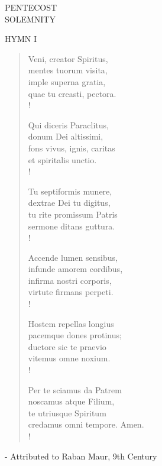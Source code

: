 \begin{center}\normalsize PENTECOST\\
\footnotesize SOLEMNITY\\
\end{center}

\noindent\small{\uppercase{Hymn I}}\normalsize
\begin{verse}
Veni, creator Spiritus,\\
mentes tuorum visita,\\
imple superna gratia,\\
quae tu creasti, pectora.\\!

Qui diceris Paraclitus,\\
donum Dei altissimi,\\
fons vivus, ignis, caritas\\
et spiritalis unctio.\\!

Tu septiformis munere,\\
dextrae Dei tu digitus,\\
tu rite promissum Patris\\
sermone ditans guttura.\\!

Accende lumen sensibus,\\
infunde amorem cordibus,\\
infirma nostri corporis,\\
virtute firmans perpeti.\\!

Hostem repellas longius\\
pacemque dones protinus;\\
ductore sic te praevio\\
vitemus omne noxium.\\!

Per te sciamus da Patrem\\
noscamus atque Filium,\\
te utriusque Spiritum\\
credamus omni tempore. Amen.\\!
\end{verse}
- Attributed to Raban Maur, 9th Century

